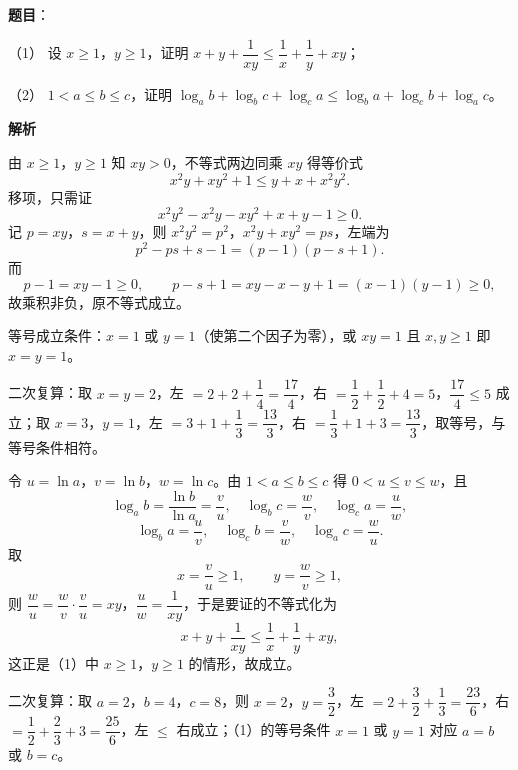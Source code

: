 \begin{answer}

\textbf{题目}：

（1） 设 $x\geqslant 1$，$y\geqslant 1$，证明 $x+y+\dfrac{1}{xy}\leqslant\dfrac1x+\dfrac1y+xy$；

（2） $1<a\leqslant b\leqslant c$，证明 $\log_a b+\log_b c+\log_c a\leqslant\log_b a+\log_c b+\log_a c$。

\textbf{解析}

由 $x\geqslant1$，$y\geqslant1$ 知 $xy>0$，不等式两边同乘 $xy$ 得等价式
\nopagebreak[4]
\[x^2y+xy^2+1\leqslant y+x+x^2y^2.\]
移项，只需证
\nopagebreak[4]
\[x^2y^2-x^2y-xy^2+x+y-1\geqslant0.\]
记 $p=xy$，$s=x+y$，则 $x^2y^2=p^2$，$x^2y+xy^2=ps$，左端为
\nopagebreak[4]
\[p^2-ps+s-1=(p-1)(p-s+1).\]
而
\nopagebreak[4]
\[p-1=xy-1\geqslant0,\qquad p-s+1=xy-x-y+1=(x-1)(y-1)\geqslant0,\]
故乘积非负，原不等式成立。

等号成立条件：$x=1$ 或 $y=1$（使第二个因子为零），或 $xy=1$ 且 $x,y\geqslant1$ 即 $x=y=1$。

二次复算：取 $x=y=2$，左 $=2+2+\dfrac14=\dfrac{17}{4}$，右 $=\dfrac12+\dfrac12+4=5$，$\dfrac{17}{4}\leqslant5$ 成立；取 $x=3$，$y=1$，左 $=3+1+\dfrac13=\dfrac{13}{3}$，右 $=\dfrac13+1+3=\dfrac{13}{3}$，取等号，与等号条件相符。

令 $u=\ln a$，$v=\ln b$，$w=\ln c$。由 $1<a\leqslant b\leqslant c$ 得 $0<u\leqslant v\leqslant w$，且
\nopagebreak[4]
\[\log_a b=\frac{\ln b}{\ln a}=\frac vu,\quad \log_b c=\frac wv,\quad \log_c a=\frac uw,\]
\nopagebreak[4]
\[\log_b a=\frac uv,\quad \log_c b=\frac vw,\quad \log_a c=\frac wu.\]
取
\nopagebreak[4]
\[x=\frac vu\geqslant1,\qquad y=\frac wv\geqslant1,\]
则 $\dfrac wu=\dfrac wv\cdot\dfrac vu=xy$，$\dfrac uw=\dfrac{1}{xy}$，于是要证的不等式化为
\nopagebreak[4]
\[x+y+\frac{1}{xy}\leqslant\frac1x+\frac1y+xy,\]
这正是（1）中 $x\geqslant1$，$y\geqslant1$ 的情形，故成立。

二次复算：取 $a=2$，$b=4$，$c=8$，则 $x=2$，$y=\dfrac32$，左 $=2+\dfrac32+\dfrac13=\dfrac{23}{6}$，右 $=\dfrac12+\dfrac23+3=\dfrac{25}{6}$，左 $\leqslant$ 右成立；（1）的等号条件 $x=1$ 或 $y=1$ 对应 $a=b$ 或 $b=c$。



\end{answer}

